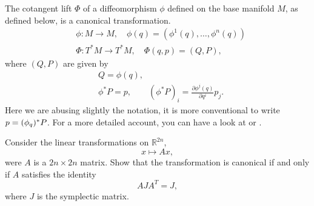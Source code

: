 \documentclass[english,fontsize=11pt,paper=a5,oneside]{scrbook}
\newcommand{\R}{\mathbb{R}}
\let\d\relax
\newcommand{\d}{\mathrm{d}}
\theoremstyle{definition}
\newenvironment{example}
  {\pushQED{\qed}\renewcommand{\qedsymbol}{$\lozenge$}\examplex}
  {\popQED\endexamplex}
\newenvironment{exercise}
  {\pushQED{\qed}\renewcommand{\qedsymbol}{$\maltese$}\exercisex}
  {\popQED\endexercisex}
\begin{document}
\begin{example}\label{ex:hamlift1}
  The cotangent lift $\Phi$ of a diffeomorphism $\phi$ defined on the base manifold $M$, as defined below, is a canonical transformation.
  \begin{align}
     & \phi:M\to M, \quad \phi(q) = \left(\phi^1(q), \ldots, \phi^n(q)\right) \\
     & \Phi:T^*M\to T^*M, \quad \Phi(q,p) = (Q, P),
  \end{align}
  where $(Q,P)$ are given by
  \begin{align}
     & Q = \phi(q),                                                                     \\
     & \phi^* P = p, \qquad (\phi^* P)_i = \frac{\partial \phi^j(q)}{\partial q^i} p_j.
  \end{align}
  Here we are abusing slightly the notation, it is more conventional to write $p = (\d\phi_{q})^* P$.
  For a more detailed account, you can have a look at \cite[Chapter 6.3 and in particular formula (6.3.4)]{book:marsdenratiu} or \cite[Proposition 6.2.8]{lectures:aom:seri}.
\end{example}

\begin{exercise}
  Consider the linear transformations on $\R^{2n}$,
  \begin{equation}
    x \mapsto A x,
  \end{equation}
  were $A$ is a $2n\times2n$ matrix.
  Show that the transformation is canonical if and only if $A$ satisfies the identity
  \begin{equation}
    A J A^T = J,
  \end{equation}
  where $J$ is the symplectic matrix.
\end{exercise}
\end{document}
